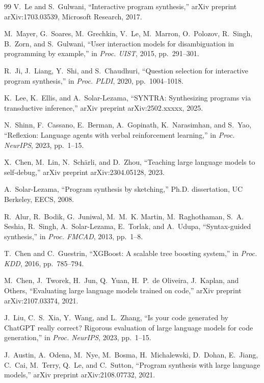 \documentclass[10pt,conference]{IEEEtran}
\begin{document}
\begin{thebibliography}{99}
 V.~Le and S.~Gulwani, ``Interactive program synthesis,'' arXiv preprint arXiv:1703.03539, Microsoft Research, 2017.

 M.~Mayer, G.~Soares, M.~Grechkin, V.~Le, M.~Marron, O.~Polozov, R.~Singh, B.~Zorn, and S.~Gulwani, ``User interaction models for disambiguation in programming by example,'' in \textit{Proc. UIST}, 2015, pp.~291--301.

 R.~Ji, J.~Liang, Y.~Shi, and S.~Chaudhuri, ``Question selection for interactive program synthesis,'' in \textit{Proc. PLDI}, 2020, pp.~1004--1018.

 K.~Lee, K.~Ellis, and A.~Solar-Lezama, ``SYNTRA: Synthesizing programs via transductive inference,'' arXiv preprint arXiv:2502.xxxxx, 2025.

 N.~Shinn, F.~Cassano, E.~Berman, A.~Gopinath, K.~Narasimhan, and S.~Yao, ``Reflexion: Language agents with verbal reinforcement learning,'' in \textit{Proc. NeurIPS}, 2023, pp.~1--15.

 X.~Chen, M.~Lin, N.~Sch\"arli, and D.~Zhou, ``Teaching large language models to self-debug,'' arXiv preprint arXiv:2304.05128, 2023.

 A.~Solar-Lezama, ``Program synthesis by sketching,'' Ph.D. dissertation, UC Berkeley, EECS, 2008.

 R.~Alur, R.~Bodik, G.~Juniwal, M.~M.~K. Martin, M.~Raghothaman, S.~A. Seshia, R.~Singh, A.~Solar-Lezama, E.~Torlak, and A.~Udupa, ``Syntax-guided synthesis,'' in \textit{Proc. FMCAD}, 2013, pp.~1--8.

 T.~Chen and C.~Guestrin, ``XGBoost: A scalable tree boosting system,'' in \textit{Proc. KDD}, 2016, pp.~785--794.

 M.~Chen, J.~Tworek, H.~Jun, Q.~Yuan, H.~P.~de Oliveira, J.~Kaplan, and Others, ``Evaluating large language models trained on code,'' arXiv preprint arXiv:2107.03374, 2021.

 J.~Liu, C.~S.~Xia, Y.~Wang, and L.~Zhang, ``Is your code generated by ChatGPT really correct? Rigorous evaluation of large language models for code generation,'' in \textit{Proc. NeurIPS}, 2023, pp.~1--15.

 J.~Austin, A.~Odena, M.~Nye, M.~Bosma, H.~Michalewski, D.~Dohan, E.~Jiang, C.~Cai, M.~Terry, Q.~Le, and C.~Sutton, ``Program synthesis with large language models,'' arXiv preprint arXiv:2108.07732, 2021.


\end{thebibliography}
\end{document}
